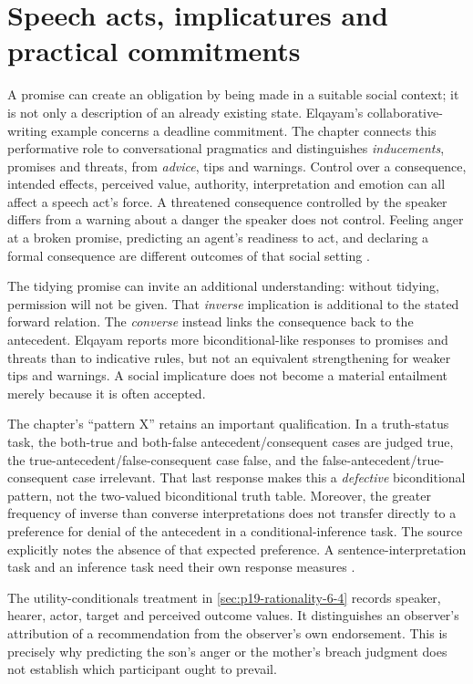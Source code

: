 \section{Speech acts, implicatures and practical commitments}
\label{sec:p19-r112-speech}

A promise can create an obligation by being made in a suitable social context;
it is not only a description of an already existing state. Elqayam's
collaborative-writing example concerns a deadline commitment. The chapter
connects this performative role to conversational pragmatics and distinguishes
\emph{inducements}, promises and threats, from \emph{advice}, tips and warnings.
Control over a consequence, intended effects, perceived value, authority,
interpretation and emotion can all affect a speech act's force. A threatened
consequence controlled by the speaker differs from a warning about a danger
the speaker does not control. Feeling anger at a broken promise, predicting
an agent's readiness to act, and declaring a formal consequence are different
outcomes of that social setting
\cite[p.~653]{Elqayam2021DeonticPsychology}.

The tidying promise can invite an additional understanding: without tidying,
permission will not be given. That \emph{inverse} implication is additional
to the stated forward relation. The \emph{converse} instead links the
consequence back to the antecedent. Elqayam reports more biconditional-like
responses to promises and threats than to indicative rules, but not an
equivalent strengthening for weaker tips and warnings. A social implicature
does not become a material entailment merely because it is often accepted.

The chapter's ``pattern X'' retains an important qualification. In a
truth-status task, the both-true and both-false antecedent/consequent cases
are judged true, the true-antecedent/false-consequent case false, and the
false-antecedent/true-consequent case irrelevant. That last response makes
this a \emph{defective} biconditional pattern, not the two-valued biconditional
truth table. Moreover, the greater frequency of inverse than converse
interpretations does not transfer directly to a preference for denial of the
antecedent in a conditional-inference task. The source explicitly notes the
absence of that expected preference. A sentence-interpretation task and an
inference task need their own response measures
\cite[p.~653]{Elqayam2021DeonticPsychology}.

The utility-conditionals treatment in \cref{sec:p19-rationality-6-4} records
speaker, hearer, actor, target and perceived outcome values. It distinguishes
an observer's attribution of a recommendation from the observer's own
endorsement. This is precisely why predicting the son's anger or the mother's
breach judgment does not establish which participant ought to prevail.

